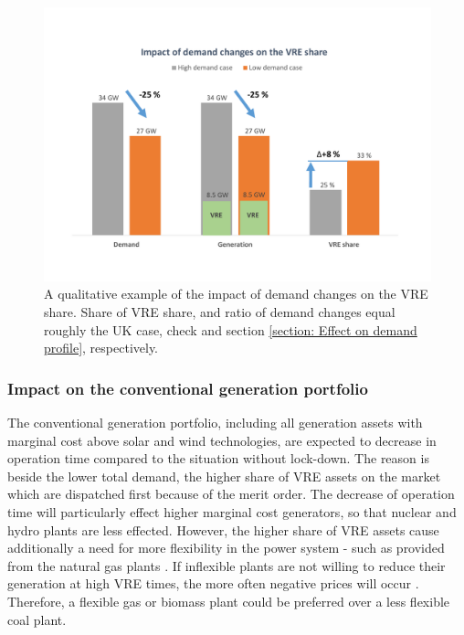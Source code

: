 \documentclass[energies,article,submit,moreauthors,pdftex]{Definitions/mdpi}
\begin{document}
\begin{figure}[H]
\centering
\hspace{-25pt}\includegraphics[trim={0cm 2cm 0cm 2cm},clip,width=1\textwidth]{Graphics/Illustrative-VRE-share-increase2.pdf}
\caption{A qualitative example of the impact of demand changes on the VRE share. Share of VRE share, and ratio of demand changes equal roughly the UK case, check \protect\cite{ENTSO-E2020ENTSO-EPlatform} and section \protect\ref{section: Effect on demand profile}, respectively.} %
\label{fig:generation_effects}
\end{figure} 


\subsubsection{Impact on the conventional generation portfolio}

The conventional generation portfolio, including all generation assets with marginal cost above solar and wind technologies, are expected to decrease in operation time compared to the situation without lock-down. The reason is beside the lower total demand, the higher share of VRE assets on the market which are dispatched first because of the merit order. The decrease of operation time will particularly effect higher marginal cost generators, so that nuclear and hydro plants are less effected. However, the higher share of VRE assets cause additionally a need for more flexibility in the power system - such as provided from the natural gas plants \cite{Hirth2014TheVariability}. If inflexible plants are not willing to reduce their generation at high VRE times, the more often negative prices will occur \cite{IEA2016Re-poweringSystems.,Cochran2013MarketSystems}. Therefore, a flexible gas or biomass plant could be preferred over a less flexible coal plant. 
\end{document}
